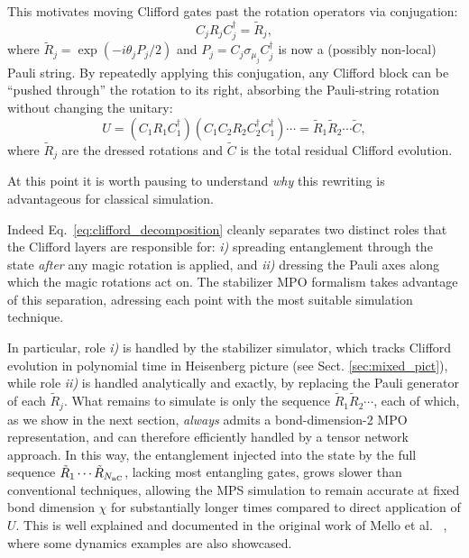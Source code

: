 \documentclass[pra,aps,twocolumn,longbibliography,preprintnumbers,superscriptaddress,nofootnotebib,10pt]{revtex4-2}
\newcommand{\numqubits}{L}  %
\newcommand{\nummagic}{{N_{\rm nC}}} %
\newcommand{\numrotdecomp}{\nummagic}
\begin{document}
This motivates moving Clifford gates past the rotation operators via 
conjugation:
\begin{equation}
C_j R_j C_j^\dagger = \tilde{R}_j,
\label{eq:clifford_conjugation}
\end{equation}
where $\tilde{R}_j = \exp(-i\theta_j P_j / 2)$ and 
$P_j = C_j \sigma_{\mu_j} C_j^\dagger$ is now a (possibly non-local) Pauli 
string. By repeatedly applying this conjugation, any Clifford block can be 
``pushed through'' the rotation to its right, absorbing the Pauli-string 
rotation without changing the unitary:
\begin{equation}
U = ( C_1 R_1 C_1^\dagger ) ( C_1 C_2 R_2 C_2^\dagger C_1^\dagger)\cdots
  = \tilde{R}_1\tilde{R}_2\cdots\tilde{C},
\label{eq:clifford_decomposition}
\end{equation}
where $\tilde{R}_j$ are the dressed rotations and $\tilde{C}$ is the 
total residual Clifford evolution.

At this point it is worth pausing to understand \textit{why} this rewriting is advantageous for classical simulation. 

Indeed Eq.~\eqref{eq:clifford_decomposition} cleanly separates two distinct roles that the Clifford layers are responsible for: \textit{i)} spreading entanglement through the state \emph{after} any magic rotation is applied, and \textit{ii)} dressing the Pauli axes along which the magic rotations act on. 
The stabilizer MPO formalism takes advantage of this separation, adressing each point with the most suitable simulation technique. 

In particular, role \textit{i)} is handled by the stabilizer simulator, which tracks Clifford evolution in polynomial time in Heisenberg picture (see Sect. \ref{sec:mixed_pict}), while role \textit{ii)} is handled analytically and exactly, by replacing the Pauli generator of each $\tilde{R}_j$. What remains to simulate is only the sequence  $\tilde{R}_1 \tilde{R}_2 \cdots$, each of which, as we show in the next section, \emph{always} admits a bond-dimension-2 MPO representation, and can therefore efficiently handled by a tensor network approach. %
In this way, the entanglement injected into the state by the full sequence $\tilde{R}_1 \cdots \tilde{R}_\numrotdecomp$, lacking most entangling gates, grows slower than conventional techniques, allowing the MPS simulation to remain accurate at fixed bond dimension $\chi$ for substantially longer times compared to direct application of $U$. This is well explained and documented in the original work of Mello et al. ~\cite{Mello_2024}, where some dynamics examples are also showcased.
\end{document}
